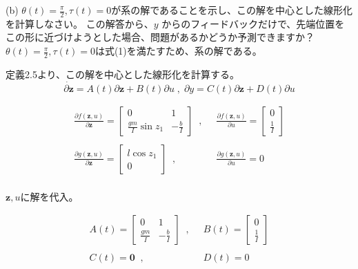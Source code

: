 \documentclass{jsarticle}
\begin{document}
(b) $\theta(t) = \frac{\pi}{2},\tau(t) = 0$が系の解であることを示し、この解を中心とした線形化を計算しなさい。
この解答から、$y$ からのフィードバックだけで、先端位置をこの形に近づけようとした場合、問題があるかどうか予測できますか？
\;\\

$\theta(t) = \frac{\pi}{2},\tau(t) = 0$は式(1)を満たすため、系の解である。\par
定義2.5より、この解を中心とした線形化を計算する。
\begin{equation}
  \dot{\partial \bm{z}} = A(t)\partial\bm{z} +B(t)\partial u\;,\;
  \partial y =C(t) \partial \bm{z} + D(t)\partial u
\end{equation}

\begin{equation*}
  \begin{array}{cc}
    \frac{\partial f(\bm{z},u)}{\partial\bm{z}} = 
    \left[
    \begin{array}{ccc}
      0 & 1 \\
      \frac{gm}{I}\sin{z_1} & -\frac{b}{I} 
    \end{array}
    \right] 
    \;\;,&\;\;
    \frac{\partial f(\bm{z},u)}{\partial u} = 
    \left[
    \begin{array}{c}
      0\\
      \frac{1}{I}
    \end{array}
    \right]\\
    \;\\
    \frac{\partial g(\bm{z},u)}{\partial \bm{z}} = 
    \left[
    \begin{array}{c}
      l\cos{z_1}\\
      0
    \end{array}
    \right]
    \;\;,&\;\;
    \frac{\partial g(\bm{z},u)}{\partial u} = 0\\
  \end{array}
\end{equation*}

$\bm{z},u$に解を代入。

\begin{equation}
  \begin{array}{cc}
    A(t) = 
    \left[
    \begin{array}{ccc}
      0 & 1 \\
      \frac{gm}{I} & -\frac{b}{I} 
    \end{array}
    \right]
    \;\;,&\;\;
    B(t) = 
    \left[
    \begin{array}{c}
      0\\
      \frac{1}{I}
    \end{array}
    \right]\\
    \;\\

    C(t) = \bm{0}
    \;\;,&\;\;
    D(t) = 0\\
  \end{array} 
\end{equation}
\end{document}
